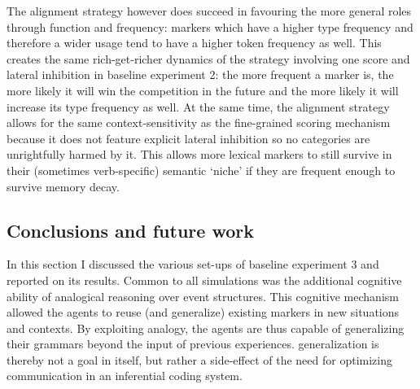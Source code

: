 The alignment strategy however does succeed in favouring the more general roles through function and frequency: markers which have a higher type frequency and therefore a wider usage tend to have a higher token frequency as well. This creates the same rich-get-richer dynamics of the strategy involving one score and lateral inhibition in baseline experiment 2: the more frequent a marker is, the more likely it will win the competition in the future and the more likely it will increase its type frequency as well. At the same time, the alignment strategy allows for the same context-sensitivity as the fine-grained scoring mechanism because it does not feature explicit lateral inhibition so no categories are unrightfully harmed by it. This allows more lexical markers to still survive in their (sometimes verb-specific) semantic `niche' if they are frequent enough to survive memory decay.

\subsection{Conclusions and future work}

In this section I discussed the various set-ups of baseline experiment 3 and reported on its results. Common to all simulations was the additional cognitive ability of analogical reasoning over event structures. This cognitive mechanism allowed the agents to reuse (and generalize) existing markers in new situations and contexts. By exploiting analogy, the agents are thus capable of generalizing their grammars beyond the input of previous experiences. generalization is thereby not a goal in itself, but rather a side-effect of the need for optimizing communication in an inferential coding system.

